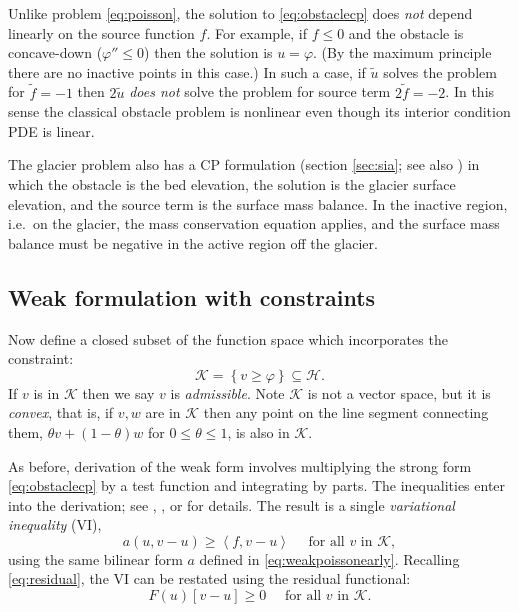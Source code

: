 \documentclass[letterpaper,final,12pt,reqno]{amsart}
\theoremstyle{claim}
\newcommand{\ip}[2]{\left<#1,#2\right>}
\numberwithin{equation}{section}
\numberwithin{figure}{section}
\numberwithin{table}{section}
\numberwithin{theorem}{section}
\begin{document}
Unlike problem \eqref{eq:poisson}, the solution to \eqref{eq:obstaclecp} does \emph{not} depend linearly on the source function $f$.  For example, if $f \le 0$ and the obstacle is concave-down ($\varphi'' \le 0$) then the solution is $u=\varphi$.  (By the maximum principle \cite{Evans2010} there are no inactive points in this case.)  In such a case, if $\tilde u$ solves the problem for $\tilde f= -1$ then $2\tilde u$ \emph{does not} solve the problem for source term $2\tilde f = -2$.  In this sense the classical obstacle problem is nonlinear even though its interior condition PDE is linear.

The glacier problem also has a CP formulation (section \ref{sec:sia}; see also \cite{Calvoetal2002}) in which the obstacle is the bed elevation, the solution is the glacier surface elevation, and the source term is the surface mass balance.  In the inactive region, i.e.~on the glacier, the mass conservation equation applies, and the surface mass balance must be negative in the active region off the glacier.

\subsection*{Weak formulation with constraints}  Now define a closed subset of the function space which incorporates the constraint:
\begin{equation}
\mathcal{K} = \left\{v \ge \varphi\right\} \subseteq \mathcal{H}.  \label{eq:Kdefine}
\end{equation}
If $v$ is in $\mathcal{K}$ then we say $v$ is \emph{admissible}.  Note $\mathcal{K}$ is not a vector space, but it is \emph{convex}, that is, if $v,w$ are in $\mathcal{K}$ then any point on the line segment connecting them, $\theta v + (1-\theta) w$ for $0 \le \theta \le 1$, is also in $\mathcal{K}$.

As before, derivation of the weak form involves multiplying the strong form \eqref{eq:obstaclecp} by a test function and integrating by parts.  The inequalities enter into the derivation; see \cite[Chapter 12]{Bueler2021}, \cite{JouvetBueler2012}, or \cite{KinderlehrerStampacchia1980} for details.  The result is a single \emph{variational inequality} (VI),
\begin{equation}
  a(u,v-u) \ge \ip{f}{v-u} \quad \text{ for all } v \text{ in } \mathcal{K}, \label{eq:obstaclevi}
\end{equation}
using the same bilinear form $a$ defined in \eqref{eq:weakpoissonearly}.  Recalling \eqref{eq:residual}, the VI can be restated using the residual functional:
\begin{equation}
  F(u)[v-u] \ge 0 \quad \text{ for all } v \text{ in } \mathcal{K}. \label{eq:obstacleviresidual}
\end{equation}
\end{document}
